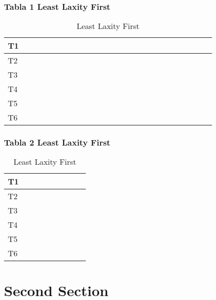 \documentclass[xcolor=table]{beamer}
\begin{document}
\begin{frame} 
\frametitle{Tabla  1 Least Laxity First } 
\begin{table} 
\centering 
\begin{tabular}{|l|l|l|l|l|l|l|l|l|l|l|l|l|l|l|l|l|l|l|l|l|l|l|l|l|} 
\hline 
T1 & & & & & & & & & & & & & & & & & & & & & & & & \\ \hline 
T2 & \cellcolor{red} & \cellcolor{red} & \cellcolor{red} & \cellcolor{red} & \cellcolor{red} & \cellcolor{red} & \cellcolor{red} & \cellcolor{red} & \cellcolor{red} & \cellcolor{red} & & & & & & & & & & & & & & \\ \hline 
T3 & & & & & & & & & & & & & & & & & & & & & & \cellcolor{green} & \cellcolor{green} & \cellcolor{green} \\ \hline 
T4 & & & & & & & & & & & \cellcolor{gray} & \cellcolor{gray} & \cellcolor{gray} & \cellcolor{gray} & \cellcolor{gray} & \cellcolor{gray} & & & & & & & & \\ \hline 
T5 & & & & & & & & & & & & & & & & & \cellcolor{yellow} & \cellcolor{yellow} & \cellcolor{yellow} & & & & & \\ \hline 
T6 & & & & & & & & & & & & & & & & & & & & \cellcolor{orange} & \cellcolor{orange} & & & \\ \hline 
\end{tabular} 
\caption{ Least Laxity First } 
\end{table} 
\end{frame} 
\begin{frame} 
\frametitle{Tabla  2 Least Laxity First } 
\begin{table} 
\centering 
\begin{tabular}{|l|l|l|l|l|l|l|l|l|} 
\hline 
T1 & & \cellcolor{blue} & \cellcolor{blue} & \cellcolor{blue} & \cellcolor{blue} & \cellcolor{blue} & & \\ \hline 
T2 & & & & & & & & \\ \hline 
T3 & \cellcolor{green} & & & & & & & \\ \hline 
T4 & & & & & & & & \\ \hline 
T5 & & & & & & & & \\ \hline 
T6 & & & & & & & & \\ \hline 
\end{tabular} 
\caption{ Least Laxity First } 
\end{table} 
\end{frame} 


\section{Second Section}
\end{document}
